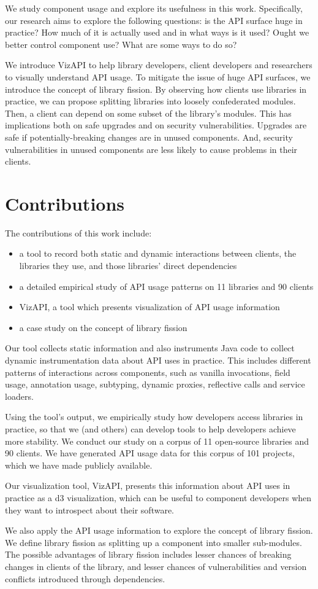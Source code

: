 We study component usage and explore its usefulness in this work. Specifically, our research aims to explore the following questions: is the API surface huge in practice? How much of it is actually used and in what ways is it used? Ought we better control component use? What are some ways to do so? 

We introduce VizAPI to help library developers, client developers and researchers to visually understand API usage. To mitigate the issue of huge API surfaces, we introduce the concept of library fission. By observing how clients use libraries in practice, we can propose splitting libraries into loosely confederated modules. Then, a client can depend on some subset of the library’s modules. This has implications both on safe upgrades and on security vulnerabilities. Upgrades are
 safe if potentially-breaking changes are in unused components. And, security vulnerabilities in unused components are less likely to cause problems in their clients.

\section{Contributions}
\label{sec:contributions}

The contributions of this work include:
\begin{itemize}
\item a tool to record both static and dynamic interactions between clients, the libraries they use, and those libraries’ direct dependencies
\item a detailed empirical study of API usage patterns on 11 libraries and 90 clients 
\item VizAPI, a tool which presents visualization of API usage information
\item a case study on the concept of library fission
\end{itemize}

Our tool collects static information and also instruments Java code to collect dynamic instrumentation data about API uses in practice. This includes different patterns of interactions across components, such as vanilla invocations, field usage, annotation usage, subtyping, dynamic proxies, reflective calls and service loaders. 

Using the tool's output, we empirically study how developers access libraries in practice, so that we (and others) can develop tools to help developers achieve more stability. We conduct our study on a corpus of 11 open-source libraries and 90 clients. We have generated API usage data for this corpus of 101 projects, which we have made publicly available. 

Our visualization tool, VizAPI, presents this information about API uses in practice as a d3 visualization, which can be useful to component developers when they want to introspect about their software. 

We also apply the API usage information to explore the concept of library fission. We define library fission as splitting up a component into smaller sub-modules. The possible advantages of library fission includes lesser chances of breaking changes in clients of the library, and lesser chances of vulnerabilities and version conflicts introduced through dependencies.
